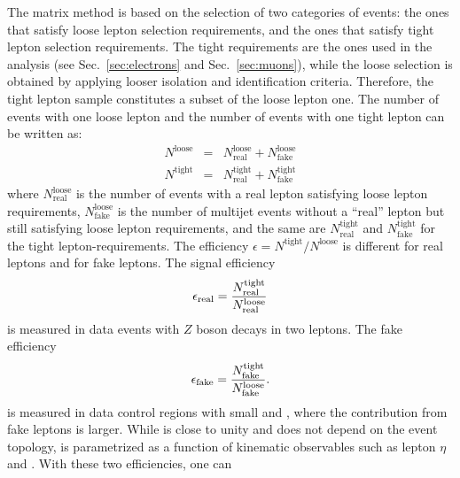 The matrix method is based on the selection of two categories of
events: the ones that satisfy loose lepton selection requirements, and
the ones that satisfy tight lepton selection requirements. The tight
requirements are the ones used in the analysis (see
Sec.~\ref{sec:electrons} and Sec.~\ref{sec:muons}), while the loose
selection is obtained by applying looser isolation and identification
criteria. Therefore, the tight lepton sample constitutes a subset of
the loose lepton one.
The number of events with one loose lepton and
the number of events with one tight lepton can be written as:
%                                                                                             
\begin{eqnarray}
  N^\mathrm{loose}
  & = & N^\mathrm{loose}_\mathrm{real}
  + N^{\mathrm{loose}}_\mathrm{fake} \nonumber \\
  N^\mathrm{tight}
  & = & N^\mathrm{tight}_\mathrm{real}
  + N^{\mathrm{tight}}_\mathrm{fake}
  \label{eqn:intro-mm-Nloose}
\end{eqnarray}
%                                                                                             
where $N^\mathrm{loose}_\mathrm{real}$ is the number of events with a
real lepton satisfying loose lepton requirements,
$N^\mathrm{loose}_\mathrm{fake}$ is the number of multijet events
without a ``real'' lepton but still satisfying loose
lepton requirements, and the same are $N^\mathrm{tight}_\mathrm{real}$
and $N^\mathrm{tight}_\mathrm{fake}$ for the tight
lepton-requirements. The efficiency
$\epsilon=N^\mathrm{tight}/N^\mathrm{loose}$ is different for real
leptons and for fake leptons. The signal efficiency
%                                                                                             
\begin{equation}
  \epsilon_{\mathrm{real}}{}
  = \frac{N^\mathrm{tight}_\mathrm{real}}{N^\mathrm{loose}_\mathrm{real}}
\end{equation}
is measured in data events with $Z$ boson decays in two leptons.
The fake efficiency
\begin{equation}
  \epsilon_{\mathrm{fake}}{}
  = \frac{N^\mathrm{tight}_\mathrm{fake}}{N^\mathrm{loose}_\mathrm{fake}}.
  \label{eqn:intro-mm-real-fake}
\end{equation}
is measured in data control regions with small \met{} and \mtw{},
where the contribution from fake leptons is larger. While \effReal{}
is close to unity and does not depend on the event topology, \effFake{} is
parametrized as a function of kinematic observables such as lepton
$\eta$ and . With these two efficiencies, one can
